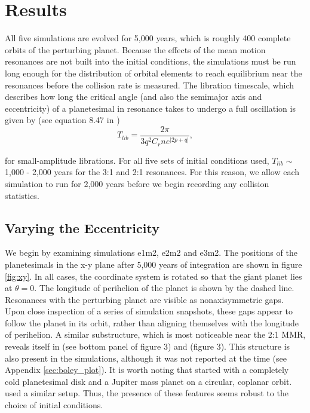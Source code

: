 \documentclass[twocolumn]{aastex63}
\begin{document}
\section{Results} \label{sec:results}

All five simulations are evolved for 5,000 years, which is roughly 400 complete orbits of the perturbing planet. Because the effects of the mean 
motion resonances are not built into the initial conditions, the simulations must be run long enough for the distribution of orbital elements to reach 
equilibrium near the resonances before the collision rate is measured. The libration timescale, which describes how long the critical angle (and also 
the semimajor axis and eccentricity) of a planetesimal in resonance takes to undergo a full oscillation is given by (see equation 8.47 in \citet{2000ssd..book.....M})
\begin{equation}\label{eq:lib_time}
	T_{lib} = \frac{2 \pi}{3 q^{2} C_{r} n e^{\left| 2p + q \right|}},
\end{equation}

\noindent for small-amplitude librations. For all five sets of initial conditions used, $T_{lib} \sim$ 1,000 - 2,000 years for the 3:1 and 2:1 resonances. 
For this reason, we allow each simulation to run for 2,000 years before we begin recording any collision statistics.

\subsection{Varying the Eccentricity} \label{sec:vary_ecc}

We begin by examining simulations e1m2, e2m2 and e3m2. The positions of the planetesimals in the x-y plane after 5,000 years of integration are 
shown in figure \ref{fig:xy}. In all cases, the coordinate system is rotated so that the giant planet lies at $\theta = 0$. The longitude of perihelion of 
the planet is shown by the dashed line. Resonances with the perturbing planet are visible as nonaxisymmetric gaps. Upon close inspection of a 
series of simulation snapshots, these gaps appear to follow the planet in its orbit, rather than aligning themselves with the longitude of perihelion. A 
similar substructure, which is most noticeable near the 2:1 MMR, reveals itself in \citet{2000Icar..143...45R} (see bottom panel of figure 3) and 
\citet{2016ApJ...818..159T} (figure 3). This structure is also present in the \citet{2017ApJ...850..103B} simulations, although it was not reported at the 
time (see Appendix \ref{sec:boley_plot}). It is worth noting that \citet{2000Icar..143...45R} started with a completely cold planetesimal disk and a 
Jupiter mass planet on a circular, coplanar
orbit. \citet{2017ApJ...850..103B} used a similar setup.
Thus, the presence of these features seems robust 
to the choice of initial conditions.
\end{document}
